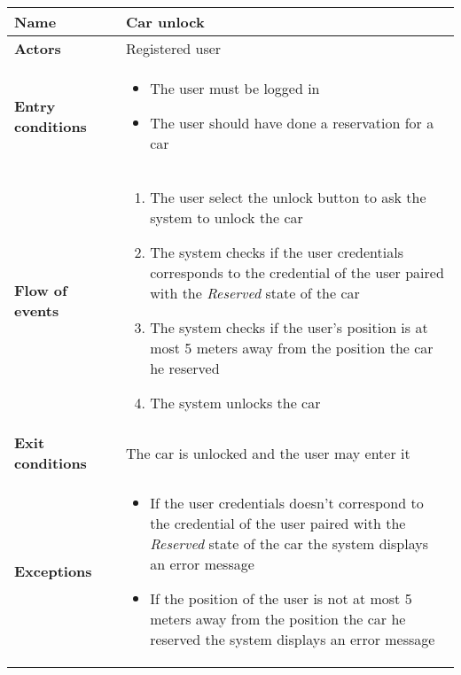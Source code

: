 \begin{tabular}{p{0.25\linewidth}p{0.75\linewidth}}
\toprule
\textbf{Name} & \textbf{Car unlock} \\
\midrule
\textbf{Actors} &  Registered user \\
\midrule
\textbf{Entry conditions} & 
\begin{itemize}
	\item The user must be logged in
	\item The user should have done a reservation for a car
\end{itemize} \\
\midrule
\textbf{Flow of events} & 
\begin{enumerate}
	\item The user select the unlock button to ask the system to unlock the car
	\item The system checks if the user credentials corresponds to the credential of the user paired with the \emph{Reserved} state of the car
	\item The system checks if the user's position is at most 5 meters away from the position the car he reserved
	\item The system unlocks the car
\end{enumerate} \\
\midrule
\textbf{Exit conditions} & The car is unlocked and the user may enter it\\
\midrule
\textbf{Exceptions} & 
\begin{itemize}
	\item If the user credentials doesn't correspond to the credential of the user paired with the \emph{Reserved} state of the car the system displays an error message
	\item If the position of the user is not at most 5 meters away from the position the car he reserved the system displays an error message
\end{itemize} \\
\bottomrule
\end{tabular}